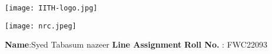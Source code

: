 \documentclass[10pt,a4paper]{report}
\begin{document}
\begin{figure*}[!tbp]
  \centering
  \begin{minipage}[b]{0.4\textwidth}
   \texttt{[image: IITH-logo.jpg]} 
  \end{minipage}
  \hfill
  \vspace{5mm}\begin{minipage}[b]{0.4\textwidth}
\raggedleft \texttt{[image: nrc.jpeg]} 
  \end{minipage}\vspace{0.2cm}
\end{figure*}
\raggedright \textbf{Name}:\hspace{1mm}Syed Tabasum nazeer\hspace{3cm} \Large \textbf{Line Assignment}\hspace{2.5cm} %
\normalsize \textbf{Roll No.} :\hspace{1mm} FWC22093\vspace{1cm}
\end{document}
